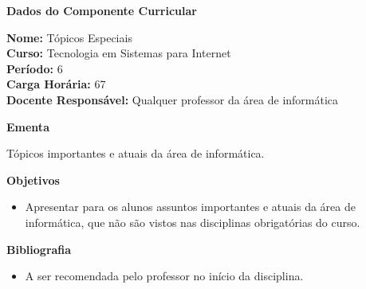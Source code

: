 

\begin{snugshade}\begin{center}\textbf{
    Dados do Componente Curricular
}\end{center}\end{snugshade}

\noindent \textbf{Nome:}                Tópicos Especiais
\\        \textbf{Curso:}               Tecnologia em Sistemas para Internet
\\        \textbf{Período:}             \unit{6}{\degree}
\\        \textbf{Carga Horária:}       \unit{67}{\hour}
\\        \textbf{Docente Responsável:} Qualquer professor da área de informática


\begin{snugshade}\begin{center}\textbf{
    Ementa
\vphantom{q}}\end{center}\end{snugshade}

\noindent
Tópicos importantes e atuais da área de informática.


\begin{snugshade}\begin{center}\textbf{
    Objetivos
}\end{center}\end{snugshade}

\begin{itemize}

\item Apresentar para os alunos assuntos importantes e atuais da área de informática, que não são vistos nas disciplinas obrigatórias do curso.

\end{itemize} 



\begin{snugshade}\begin{center}\textbf{
    Bibliografia
}\end{center}\end{snugshade}

\begin{itemize} 
 \item A ser recomendada pelo professor no início da disciplina.
\end{itemize}
